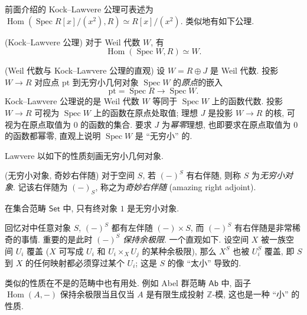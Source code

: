 前面介绍的 Kock--Lawvere 公理可表述为 $\operatorname{Hom}(\operatorname{Spec}R[x]/(x^2),R) \simeq R[x]/(x^2)$. 类似地有如下公理.

\begin{axiom}
	{(Kock--Lawvere 公理)}
	对于 Weil 代数 $W$, 有
	$$
	\operatorname{Hom}(\operatorname{Spec}W,R)\simeq W.
	$$
\end{axiom}

\begin{remark}
	{(Weil 代数与 Kock--Lawvere 公理的直观)}
	设 $W=R\oplus J$ 是 Weil 代数. 投影 $W \to R$ 对应点 $\text{pt}$ 到无穷小几何对象 $\operatorname{Spec}W$ 的\emph{原点}的嵌入 $$\text{pt} = \operatorname{Spec} R \to \operatorname{Spec}W.$$
	Kock--Lawvere 公理说的是 Weil 代数 $W$ 等同于 $\operatorname{Spec}W$ 上的函数代数. 投影 $W\to R$ 可视为 $\operatorname{Spec}W$ 上的函数在原点处取值; 理想 $J$ 是投影 $W\to R$ 的核, 可视为在原点取值为 $0$ 的函数的集合.
	要求 $J$ 为\emph{幂零}理想, 也即要求在原点取值为 $0$ 的函数都幂零, 直观上说明 $\operatorname{Spec}W$ 是 ``无穷小'' 的.
\end{remark}

Lawvere 以如下的性质刻画无穷小几何对象.

\begin{definition}
	{(无穷小对象, 奇妙右伴随)}
	对于空间 $S$, 若 $(-)^S$ 有右伴随, 则称 $S$ 为\emph{无穷小对象}. 记该右伴随为 $(-)_S$, 称之为\emph{奇妙右伴随} (amazing right adjoint).
\end{definition}

\begin{example}
	{}
	在集合范畴 $\mathsf {Set}$ 中, 只有终对象 $1$ 是无穷小对象.
\end{example}

\begin{remark}
	{}
	回忆对\topos{}中任意对象 $S$, $(-)^S$ 都有左伴随 $(-)\times S$, 而 $(-)^S$ 有右伴随是非常稀奇的事情. 重要的是此时 $(-)^S$ \emph{保持余极限}. 一个直观如下. 设空间 $X$ 被一族空间 $U_i$ 覆盖 ($X$ 可写成 $U_i$ 和 $U_i\times_X U_j$ 的某种余极限), 那么 $X^S$ 也被 $U_i^S$ 覆盖, 即 $S$ 到 $X$ 的任何映射都必须穿过某个 $U_i$; 这是 $S$ 的像 ``太小'' 导致的.
	
	类似的性质在不是\topos{}的范畴中也有用处. 例如 Abel 群范畴 $\mathsf {Ab}$ 中, 函子 $\operatorname{Hom}(A,{-})$ 保持余极限当且仅当 $A$ 是有限生成投射 $\mathbb{Z}$-模, 这也是一种 ``小'' 的性质.
	
\end{remark}


